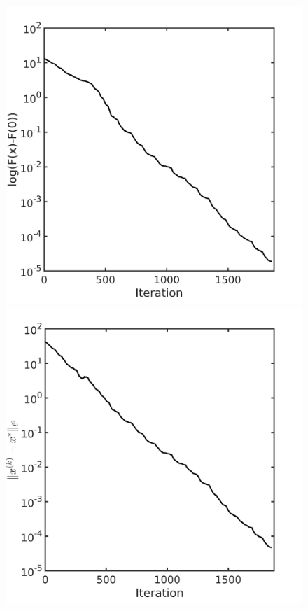 \documentclass[final,1p,times]{elsarticle}
\begin{document}
{\begin{table}[!htbp]
\begin{center}
\begin{tabular}{|c|c|c|}
\end{tabular}
\end{center}
\end{table}
\begin{figure}[!htbp]
	\centering
	  \includegraphics[scale=0.2]{../figures/ackley100D.png}
	  \includegraphics[scale=0.2]{../figures/ackley100D_dist.png}
\end{figure}
}
\end{document}

